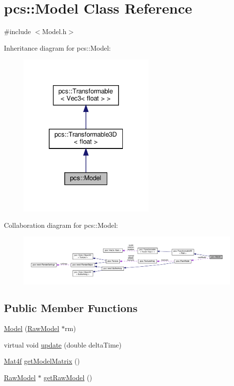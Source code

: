 \hypertarget{classpcs_1_1Model}{}\section{pcs\+:\+:Model Class Reference}
\label{classpcs_1_1Model}


{\ttfamily \#include $<$Model.\+h$>$}



Inheritance diagram for pcs\+:\+:Model\+:\nopagebreak
\begin{figure}[H]
\begin{center}
\leavevmode
\includegraphics[width=193pt]{classpcs_1_1Model__inherit__graph}
\end{center}
\end{figure}


Collaboration diagram for pcs\+:\+:Model\+:
\nopagebreak
\begin{figure}[H]
\begin{center}
\leavevmode
\includegraphics[width=350pt]{classpcs_1_1Model__coll__graph}
\end{center}
\end{figure}
\subsection*{Public Member Functions}
\begin{DoxyCompactItemize}
\item 
\hyperlink{classpcs_1_1Model_a353c041e246baa1bc4ab54b23918dfb9}{Model} (\hyperlink{classpcs_1_1RawModel}{Raw\+Model} $\ast$rm)
\item 
virtual void \hyperlink{classpcs_1_1Model_a143831f415158255b910e25ac542de19}{update} (double delta\+Time)
\item 
\hyperlink{structpcs_1_1Mat4f}{Mat4f} \hyperlink{classpcs_1_1Model_a70cb396d1e636d013ec22257be078120}{get\+Model\+Matrix} ()
\item 
\hyperlink{classpcs_1_1RawModel}{Raw\+Model} $\ast$ \hyperlink{classpcs_1_1Model_aaffd9c9e96661db20405c0c12138c940}{get\+Raw\+Model} ()
\end{DoxyCompactItemize}
